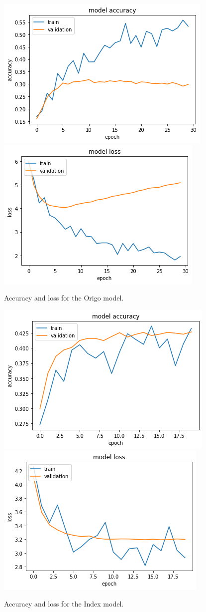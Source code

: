 \documentclass[journal]{IEEEtai}
\begin{document}
\begin{figure}
\centering
\includegraphics[width=0.45\linewidth]{fig/training_accuracy_30_epoch.png}
\includegraphics[width=0.45\linewidth]{fig/training_loss_30_epoch.png}
\caption{Accuracy and loss for the Origo model.}
\label{fig:training_origo}
\end{figure}

\begin{figure}
\centering
\includegraphics[width=0.45\linewidth]{fig/training_accuracy_index.png}
\includegraphics[width=0.45\linewidth]{fig/training_loss_index.png}
\caption{Accuracy and loss for the Index model.}
\label{fig:training_index}
\end{figure}
\end{document}
